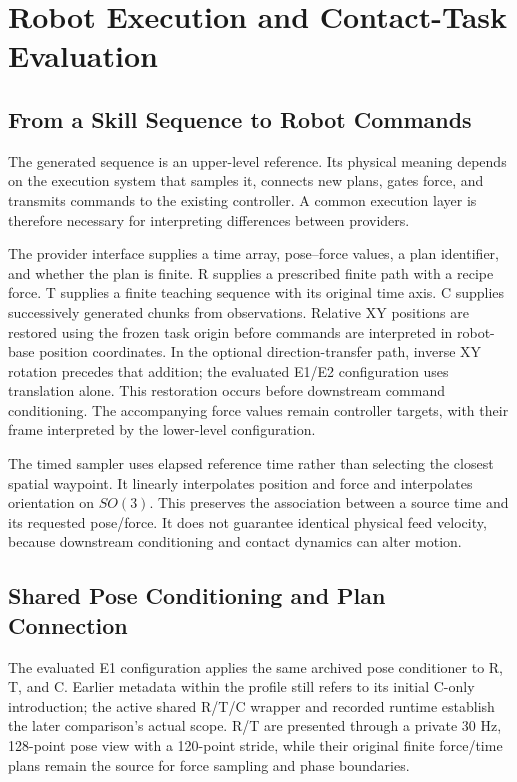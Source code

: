 \chapter{Robot Execution and Contact-Task Evaluation}
\label{chap:execution}

\section{From a Skill Sequence to Robot Commands}
The generated sequence is an upper-level reference. Its physical meaning depends on the execution system that samples it, connects new plans, gates force, and transmits commands to the existing controller. A common execution layer is therefore necessary for interpreting differences between providers.

The provider interface supplies a time array, pose--force values, a plan identifier, and whether the plan is finite. R supplies a prescribed finite path with a recipe force. T supplies a finite teaching sequence with its original time axis. C supplies successively generated chunks from observations. Relative XY positions are restored using the frozen task origin before commands are interpreted in robot-base position coordinates. In the optional direction-transfer path, inverse XY rotation precedes that addition; the evaluated E1/E2 configuration uses translation alone. This restoration occurs before downstream command conditioning. The accompanying force values remain controller targets, with their frame interpreted by the lower-level configuration.

The timed sampler uses elapsed reference time rather than selecting the closest spatial waypoint. It linearly interpolates position and force and interpolates orientation on \(SO(3)\). This preserves the association between a source time and its requested pose/force. It does not guarantee identical physical feed velocity, because downstream conditioning and contact dynamics can alter motion.

\section{Shared Pose Conditioning and Plan Connection}
The evaluated E1 configuration applies the same archived pose conditioner to R, T, and C. Earlier metadata within the profile still refers to its initial C-only introduction; the active shared R/T/C wrapper and recorded runtime establish the later comparison's actual scope. R/T are presented through a private 30 Hz, 128-point pose view with a 120-point stride, while their original finite force/time plans remain the source for force sampling and phase boundaries.

